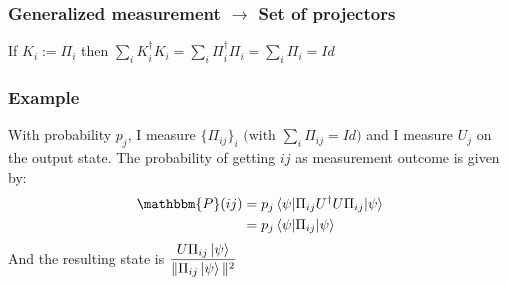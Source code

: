 \documentclass{article}
\begin{document}
\subsubsection*{Generalized measurement $\rightarrow$ Set of projectors}
If $K_i := \Pi_i$ then $\sum_i K_i^\dagger K_i = \sum_i \Pi_i^\dagger\Pi_i =
\sum_i \Pi_i = Id$

\subsubsection*{Example}
With probability $p_j$, I measure $\{\Pi_{ij}\}_i \text{ (with } \sum_i \Pi_{ij} = Id)$ and
I measure $U_j$ on the output state.
The probability of getting $ij$ as measurement outcome is given by:
\begin{equation}
    \begin{aligned}
        \mathbbm{P}(ij)
            &= p_j\braket{\psi | \Pi_{ij} U^\dagger U \Pi_{ij} | \psi} \\
            &= p_j\braket{\psi|\Pi_{ij}|\psi}
    \end{aligned}
\end{equation}
\noindent
And the resulting state is
$\dfrac{U\Pi_{ij}\ket{\psi}}{\|\Pi_{ij}\ket{\psi}\|^2}$
\end{document}
